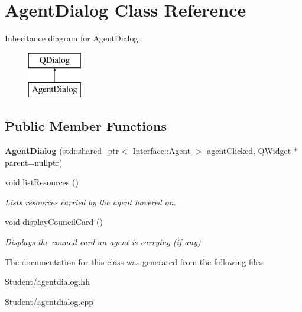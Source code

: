 \hypertarget{class_agent_dialog}{\section{Agent\-Dialog Class Reference}
\label{class_agent_dialog}
}
Inheritance diagram for Agent\-Dialog\-:\begin{figure}[H]
\begin{center}
\leavevmode
\includegraphics[height=2.000000cm]{class_agent_dialog}
\end{center}
\end{figure}
\subsection*{Public Member Functions}
\begin{DoxyCompactItemize}
\item 
\hypertarget{class_agent_dialog_acd7bb2e6ddfcaab0f95a1b50d4681395}{{\bfseries Agent\-Dialog} (std\-::shared\-\_\-ptr$<$ \hyperlink{class_interface_1_1_agent}{Interface\-::\-Agent} $>$ agent\-Clicked, Q\-Widget $\ast$parent=nullptr)}\label{class_agent_dialog_acd7bb2e6ddfcaab0f95a1b50d4681395}

\item 
\hypertarget{class_agent_dialog_aa010c10099c14028f79a225b85bd700b}{void \hyperlink{class_agent_dialog_aa010c10099c14028f79a225b85bd700b}{list\-Resources} ()}\label{class_agent_dialog_aa010c10099c14028f79a225b85bd700b}

\begin{DoxyCompactList}\small\item\em Lists resources carried by the agent hovered on. \end{DoxyCompactList}\item 
\hypertarget{class_agent_dialog_a3a05b55c04acb50d7f152dd8e6265452}{void \hyperlink{class_agent_dialog_a3a05b55c04acb50d7f152dd8e6265452}{display\-Council\-Card} ()}\label{class_agent_dialog_a3a05b55c04acb50d7f152dd8e6265452}

\begin{DoxyCompactList}\small\item\em Displays the council card an agent is carrying (if any) \end{DoxyCompactList}\end{DoxyCompactItemize}


The documentation for this class was generated from the following files\-:\begin{DoxyCompactItemize}
\item 
Student/agentdialog.\-hh\item 
Student/agentdialog.\-cpp\end{DoxyCompactItemize}
